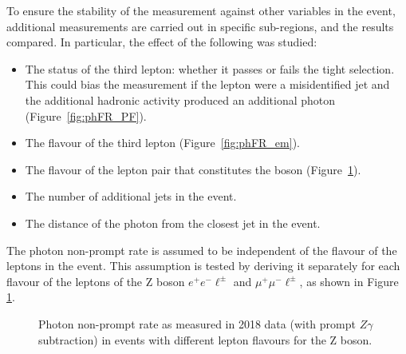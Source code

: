 To ensure the stability of the measurement against other variables in the event,
additional measurements are carried out in specific sub-regions, and the results compared.
In particular, the effect of the following was studied:
\begin{itemize}
\item The status of the third lepton: whether it passes or fails the tight selection.
  This could bias the measurement if the lepton were a misidentified jet
  and the additional hadronic activity produced an additional \nonprompt photon (Figure~\ref{fig:phFR_PF}).
\item The flavour of the third lepton (Figure~\ref{fig:phFR_em}).
\item The flavour of the lepton pair that constitutes the \PZ boson (Figure~\ref{fig:phFR_2e2m}).
\item The number of additional jets in the event.
\item The distance of the photon from the closest jet in the event.
\end{itemize}

The photon non-prompt rate is assumed to be independent of the flavour of the leptons in the event.
This assumption is tested by deriving it separately for each flavour of the leptons of the Z boson $e^+ e^- \ell^\pm$ and $\mu^+ \mu^- \ell^\pm$, as shown in Figure \ref{fig:phFR_2e2m}.

\begin{figure}
%
\caption{Photon non-prompt rate as measured in 2018 data (with prompt $Z\gamma$ subtraction) in events with different lepton flavours for the Z boson.}
\label{fig:phFR_2e2m}
\end{figure}

